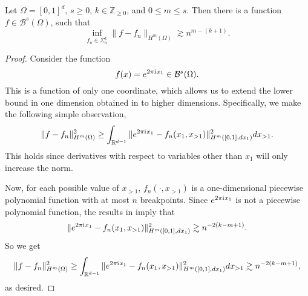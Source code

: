 \begin{theorem}\label{relu-lower-bound}
 Let $\Omega = [0,1]^d$, $s\geq 0$, $k\in \mathbb{Z}_{\geq 0}$, and $0\leq m\leq s$. 
 Then there is a function $f\in \mathcal{B}^s(\Omega)$, such that
 \begin{equation}
  \inf_{f_n\in \Sigma^k_{n}} \|f - f_n\|_{H^m(\Omega)} \gtrsim n^{m-(k+1)}.
 \end{equation}
\end{theorem}
\begin{proof}
Consider the function
 \begin{equation}
  f(x) = e^{2\pi {\mathrm{i}\mkern1mu} x_1}\in \mathcal{B}^s(\Omega).
 \end{equation}
 This is a function of only one coordinate, which allows us to extend the lower bound in one dimension obtained in \cite{lin2014lower} to higher dimensions. 
 Specifically, we make the following simple observation,
 \begin{equation}
  \|f - f_n\|^2_{H^m(\Omega)} \geq \int_{\mathbb{R}^{d-1}} \|e^{2\pi {\mathrm{i}\mkern1mu} x_1} - f_n(x_1,x_{>1})\|^2_{H^m([0,1],dx_1)} dx_{>1}.
 \end{equation}
 This holds since derivatives with respect to variables other than $x_1$ will only increase the norm.
 
 Now, for each possible value of $x_{>1}$, $f_n(\cdot,x_{>1})$ is a one-dimensional piecewise polynomial function with at most $n$ breakpoints. Since $e^{2\pi {\mathrm{i}\mkern1mu} x_1}$ is not a piecewise polynomial function, the results in \cite{lin2014lower} imply that
 \begin{equation}
  \|e^{2\pi {\mathrm{i}\mkern1mu} x_1} - f_n(x_1,x_{>1})\|^2_{H^m([0,1],dx_1)} \gtrsim n^{-2(k-m+1)}.
 \end{equation}
 So we get
 \begin{equation}
  \|f - f_n\|^2_{H^m(\Omega)} \geq \int_{\mathbb{R}^{d-1}} \|e^{2\pi {\mathrm{i}\mkern1mu} x_1} - f_n(x_1,x_{>1})\|^2_{H^m([0,1],dx_1)} dx_{>1}\gtrsim n^{-2(k-m+1)},
 \end{equation}
 as desired.


\end{proof}